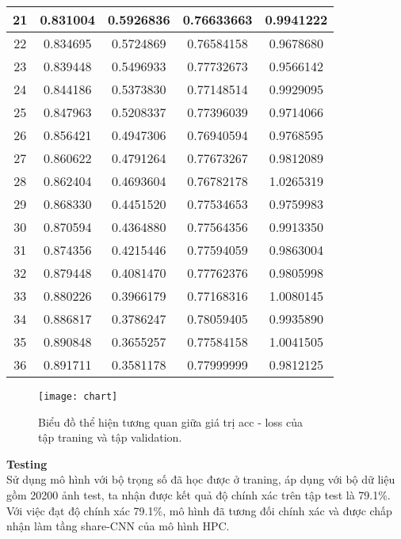 \documentclass[13pt, a4paper]{extreport}
\begin{document}
\begin{tabular}{|c|c|c|c|c|}
	21 & 0.831004 & 0.5926836 & 0.76633663 & 0.9941222\\ \hline
	22 & 0.834695 & 0.5724869 & 0.76584158 & 0.9678680\\ \hline
	23 & 0.839448 & 0.5496933 & 0.77732673 & 0.9566142\\ \hline
	24 & 0.844186 & 0.5373830 & 0.77148514 & 0.9929095\\ \hline
	25 & 0.847963 & 0.5208337 & 0.77396039 & 0.9714066\\ \hline
	26 & 0.856421 & 0.4947306 & 0.76940594 & 0.9768595\\ \hline
	27 & 0.860622 & 0.4791264 & 0.77673267 & 0.9812089\\ \hline
	28 & 0.862404 & 0.4693604 & 0.76782178 & 1.0265319\\ \hline
	29 & 0.868330 & 0.4451520 & 0.77534653 & 0.9759983\\ \hline
	30 & 0.870594 & 0.4364880 & 0.77564356 & 0.9913350\\ \hline
	31 & 0.874356 & 0.4215446 & 0.77594059 & 0.9863004\\ \hline
	32 & 0.879448 & 0.4081470 & 0.77762376 & 0.9805998\\ \hline
	33 & 0.880226 & 0.3966179 & 0.77168316 & 1.0080145\\ \hline
	34 & 0.886817 & 0.3786247 & 0.78059405 & 0.9935890\\ \hline
	35 & 0.890848 & 0.3655257 & 0.77584158 & 1.0041505\\ \hline
	36 & 0.891711 & 0.3581178 & 0.77999999 & 0.9812125\\ \hline 
\end{tabular}


\begin{figure}[H]
  \centering
  \captionsetup{justification=centering,margin=2cm}
    \texttt{[image: chart]}
   \caption{\large Biểu đồ thể hiện tương quan giữa giá trị acc - loss của \\ tập traning và tập validation.}
\end{figure}

\indent \textbf{Testing}\\
\indent Sử dụng mô hình với bộ trọng số đã học được ở traning, áp dụng với bộ dữ liệu gồm 20200 ảnh test, ta nhận được kết quả độ chính xác trên tập test là 79.1\%.
\indent Với việc đạt độ chính xác 79.1\%, mô hình đã tương đối chính xác và được chấp nhận làm tầng share-CNN của mô hình HPC.
\end{document}
